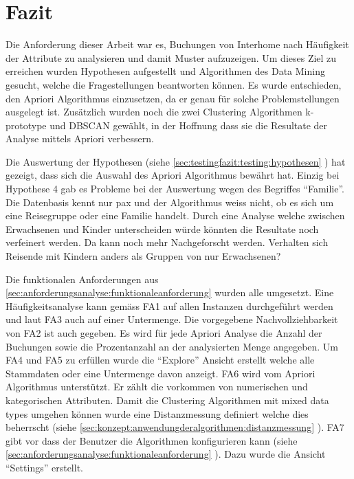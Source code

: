 \section{Fazit}
Die Anforderung dieser Arbeit war es, Buchungen von Interhome nach Häufigkeit der Attribute zu analysieren und damit Muster aufzuzeigen. Um dieses Ziel zu erreichen wurden Hypothesen aufgestellt und Algorithmen des Data Mining gesucht, welche die Fragestellungen beantworten können. Es wurde entschieden, den Apriori Algorithmus einzusetzen, da er genau für solche Problemstellungen ausgelegt ist. Zusätzlich wurden noch die zwei Clustering Algorithmen k-prototype und DBSCAN gewählt, in der Hoffnung dass sie die Resultate der Analyse mittels Apriori verbessern. 

Die Auswertung der Hypothesen (siehe \cref{sec:testingfazit:testing:hypothesen} ) hat gezeigt, dass sich die Auswahl des Apriori Algorithmus bewährt hat. Einzig bei Hypothese 4 gab es Probleme bei der Auswertung wegen des Begriffes "`Familie"'. Die Datenbasis kennt nur \gls{pax} und der Algorithmus weiss nicht, ob es sich um eine Reisegruppe oder eine Familie handelt. Durch eine Analyse welche zwischen Erwachsenen und Kinder unterscheiden würde könnten die Resultate noch verfeinert werden. Da kann noch mehr Nachgeforscht werden. Verhalten sich Reisende mit Kindern anders als Gruppen von nur Erwachsenen?

Die funktionalen Anforderungen aus \cref{sec:anforderungsanalyse:funktionaleanforderung}  wurden alle umgesetzt. Eine Häufigkeitsanalyse kann gemäss FA1 auf allen Instanzen durchgeführt werden und laut FA3 auch auf einer Untermenge. Die vorgegebene Nachvollziehbarkeit von FA2 ist auch gegeben. Es wird für jede Apriori Analyse die Anzahl der Buchungen sowie die Prozentanzahl an der analysierten Menge angegeben. Um FA4 und FA5 zu erfüllen wurde die "`Explore"' Ansicht erstellt welche alle Stammdaten oder eine Untermenge davon anzeigt. FA6 wird vom Apriori Algorithmus unterstützt. Er zählt die vorkommen von numerischen und kategorischen Attributen. Damit die Clustering Algorithmen mit mixed data types umgehen können wurde eine Distanzmessung definiert welche dies beherrscht (siehe \cref{sec:konzept:anwendungderalgorithmen:distanzmessung} ). FA7 gibt vor dass der Benutzer die Algorithmen konfigurieren kann (siehe \cref{sec:anforderungsanalyse:funktionaleanforderung} ). Dazu wurde die Ansicht "`Settings"' erstellt.  

